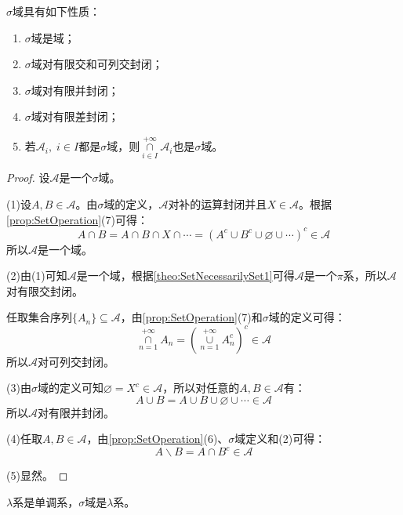 \begin{property}\label{prop:SigmaField}
	$\sigma$域具有如下性质：
	\begin{enumerate}
		\item $\sigma$域是域；
		\item $\sigma$域对有限交和可列交封闭；
		\item $\sigma$域对有限并封闭；
		\item $\sigma$域对有限差封闭；
		\item 若$\mathscr{A}_i,\;i\in I$都是$\sigma$域，则$\underset{i\in I}{\overset{+\infty}{\cap}}\mathscr{A}_i$也是$\sigma$域。
	\end{enumerate}
\end{property}
\begin{proof}
	设$\mathscr{A}$是一个$\sigma$域。\par
	(1)设$A,B\in\mathscr{A}$。由$\sigma$域的定义，$\mathscr{A}$对补的运算封闭并且$X\in\mathscr{A}$。根据\cref{prop:SetOperation}(7)可得：
	\begin{equation*}
		A\cap B=A\cap B\cap X\cap\cdots=(A^c\cup B^c\cup\varnothing\cup\cdots)^c\in\mathscr{A}
	\end{equation*}
	所以$\mathscr{A}$是一个域。\par
	(2)由(1)可知$\mathscr{A}$是一个域，根据\cref{theo:SetNecessarilySet1}可得$\mathscr{A}$是一个$\pi$系，所以$\mathscr{A}$对有限交封闭。\par
	任取集合序列$\{A_n\}\subseteq\mathscr{A}$，由\cref{prop:SetOperation}(7)和$\sigma$域的定义可得：
	\begin{equation*}
		\underset{n=1}{\overset{+\infty}{\cap}}A_n=\left(\underset{n=1}{\overset{+\infty}{\cup}}A_n^c\right)^c\in\mathscr{A}
	\end{equation*}
	所以$\mathscr{A}$对可列交封闭。\par
	(3)由$\sigma$域的定义可知$\varnothing=X^c\in\mathscr{A}$，所以对任意的$A,B\in\mathscr{A}$有：
	\begin{equation*}
		A\cup B=A\cup B\cup\varnothing\cup\cdots\in\mathscr{A}
	\end{equation*}
	所以$\mathscr{A}$对有限并封闭。\par
	(4)任取$A,B\in\mathscr{A}$，由\cref{prop:SetOperation}(6)、$\sigma$域定义和(2)可得：
	\begin{equation*}
		A\backslash B=A\cap B^c\in\mathscr{A}
	\end{equation*}\par
	(5)显然。
\end{proof}
\begin{theorem}\label{theo:SetNecessarilySet2}
	$\lambda$系是单调系，$\sigma$域是$\lambda$系。
\end{theorem}
